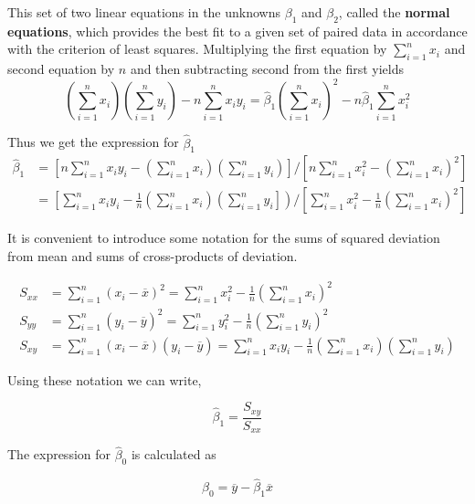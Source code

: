 \documentclass[twoside]{book}
\begin{document}
This set of two linear equations in the unknowns $\beta_1$ and $\beta_2$, called the \textbf{normal equations}, which provides the best ﬁt to a given set of paired data in accordance with the criterion of least squares. Multiplying the first equation by $\sum_{i=1}^n x_i$ and second equation by $n$ and then subtracting second from the first yields
$$\left(\sum_{i=1}^{n} x_i\right)\left(\sum_{i=1}^{n} y_i\right) - n\sum_{i=1}^{n} x_i y_i = \hat{\beta}_1\left(\sum_{i=1}^{n} x_i\right)^2 - n\hat{\beta}_1\sum_{i=1}^{n} x_i^2  $$

Thus we get the expression for $\hat{\beta}_1$
\begin{align*}
\hat{\beta}_1 &=
\left[
n\sum_{i=1}^{n} x_i y_i
-
\left(\sum_{i=1}^{n} x_i\right)\left(\sum_{i=1}^{n} y_i\right)
\right]
\bigg/
\left[
n\sum_{i=1}^{n} x_i^2
-
\left(\sum_{i=1}^{n} x_i\right)^2
\right]
\\
&=
\left[
\sum_{i=1}^{n} x_i y_i
-
\frac{1}{n}\left(\sum_{i=1}^{n} x_i\right)\left(\sum_{i=1}^{n} y_i\right]
\right)
\bigg/
\left[
\sum_{i=1}^{n} x_i^2
-
\frac{1}{n}\left(\sum_{i=1}^{n} x_i\right)^2
\right]
\end{align*}


It is convenient to introduce some notation for the sums of squared deviation from mean and sums of cross-products of deviation.

\begin{textbox}
\begin{align*}
S_{xx} &= \sum_{i=1}^{n} (x_i - \overline{x})^2 = \sum_{i=1}^{n} x_i^2 - \frac{1}{n}\left( \sum_{i=1}^{n} x_i \right)^2 \\
S_{yy} &= \sum_{i=1}^{n} (y_i - \overline{y})^2 = \sum_{i=1}^{n} y_i^2 - \frac{1}{n}\left( \sum_{i=1}^{n} y_i \right)^2 \\
S_{xy} &= \sum_{i=1}^{n} (x_i - \overline{x})(y_i - \overline{y}) = \sum_{i=1}^{n} x_i y_i - \frac{1}{n}\left( \sum_{i=1}^{n} x_i \right) \left( \sum_{i=1}^{n} y_i \right)
\end{align*}
\end{textbox}

Using these notation we can write,
\begin{textbox}
$$\hat{\beta}_1 = \dfrac{S_{xy}}{S_{xx}}$$
\end{textbox}
The expression for $\hat{\beta}_0$ is calculated as
\begin{textbox}
\[
\hat{\beta}_0 = \overline{y} - \hat{\beta}_1 \overline{x}
\]
\end{textbox}
\end{document}
